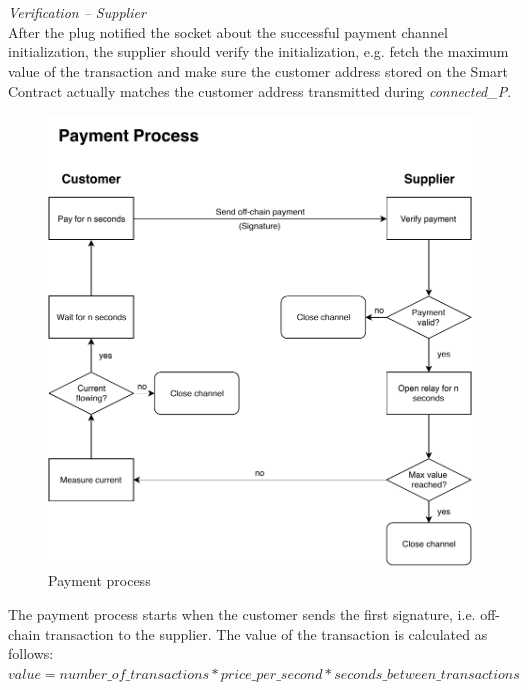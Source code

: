 \\\\
\textit{Verification – Supplier}\\
After the plug notified the socket about the successful payment channel initialization, the supplier should verify the initialization, e.g. fetch the maximum value of the transaction and make sure the customer address stored on the Smart Contract actually matches the customer address transmitted during \textit{connected\_P}.
\newpage
\begin{figure}[H]
    \includegraphics[width=\textwidth]{img/Plug-Socket-payment_process.pdf}
    \caption{Payment process}
    \label{fig:payment_process}
\end{figure}
The payment process starts when the customer sends the first signature, i.e. off-chain transaction to the supplier. The value of the transaction is calculated as follows:
\\
$value = number\_of\_transactions * price\_per\_second * seconds\_between\_transactions$
\\
